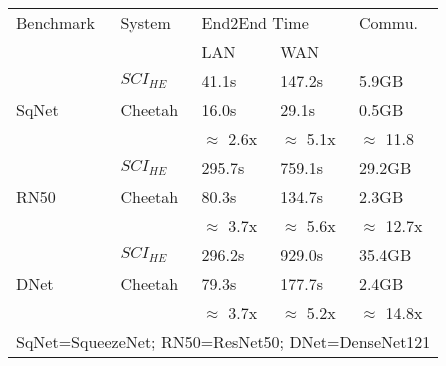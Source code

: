 \begin{tabular}{lllll}
\hline
Benchmark & System                                & \multicolumn{2}{l}{End2End Time} & Commu.          \\
          &                                       & LAN             & WAN            &                 \\ \hline
          & ${SCI}_{HE}$ & 41.1s           & 147.2s         & 5.9GB           \\
SqNet     & Cheetah                               & 16.0s           & 29.1s          & 0.5GB           \\ \cline{3-5} 
          &                                       & $\approx$ 2.6x  & $\approx$ 5.1x & $\approx$ 11.8  \\ \hline
          & $SCI_{HE}$ & 295.7s          & 759.1s         & 29.2GB          \\
RN50      & Cheetah                               & 80.3s           & 134.7s         & 2.3GB           \\ \cline{3-5} 
          &                                       & $\approx$ 3.7x  & $\approx$ 5.6x & $\approx$ 12.7x \\ \hline
          & $SCI_{HE}$ & 296.2s          & 929.0s         & 35.4GB          \\
DNet      & Cheetah                               & 79.3s           & 177.7s         & 2.4GB           \\ \cline{3-5} 
          &                                       & $\approx$ 3.7x  & $\approx$ 5.2x & $\approx$ 14.8x \\ \hline
\multicolumn{5}{l}{SqNet=SqueezeNet; RN50=ResNet50; DNet=DenseNet121}                                 
\end{tabular}